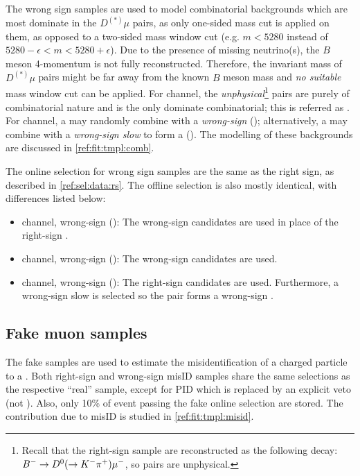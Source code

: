 The wrong sign samples are used to model combinatorial backgrounds which are
most dominate in the $D^{(*)}\mu$ pairs,
as only one-sided mass cut is applied on them, as opposed to a two-sided
mass window cut
(e.g. $m < 5280$ instead of $5280 - \epsilon < m < 5280 + \epsilon$).
Due to the presence of missing neutrino(s), the $B$ meson 4-momentum is not
fully reconstructed.
Therefore,
the invariant mass of $D^{(*)}\mu$ pairs might be far away from the known $B$
meson mass and \emph{no suitable} mass window cut can be applied.
For \Dz channel, the \emph{unphysical}\footnote{
    Recall that the right-sign sample are reconstructed as the following decay:
    ${{{B}^-}} \rightarrow {\ensuremath{{D}^0}} (\rightarrow {\ensuremath{{K}^-}} {\ensuremath{{\pi}^+}}) {\mu^-}$,
    so \Dz\mup pairs are unphysical.
} \Dz\mup pairs are purely of combinatorial
nature and is the only dominate combinatorial;
this is referred as \BComb.
For \Dstar channel, a \Dstarp may randomly combine with a
\emph{wrong-sign \mup} (\BComb); alternatively, a \Dz may combine with a
\emph{wrong-sign slow \pim} to form a \Dstarm (\DstComb).
The modelling of these backgrounds are discussed in
\cref{ref:fit:tmpl:comb}.

The online selection for wrong sign samples are the same as the right sign,
as described in \cref{ref:sel:data:rs}.
The offline selection is also mostly identical, with differences listed below:

\begin{itemize}
    \item \Dz channel, wrong-sign \muon (\BComb):
        The wrong-sign \Dz\mup candidates are used in place of the right-sign
        \Dz\mun.
    \item \Dstar channel, wrong-sign \muon (\BComb):
        The wrong-sign \Dz\mup candidates are used.
    \item \Dstar channel, wrong-sign \pion (\DstComb):
        The right-sign \Dz\mun candidates are used.
        Furthermore, a wrong-sign slow \pim is selected so the \Dz\pim pair
        forms a wrong-sign \Dstarm.
\end{itemize}


\subsection{Fake muon samples}

The fake \muon samples are used to estimate the misidentification of a charged
particle to a \muon.
Both right-sign and wrong-sign misID samples share the same selections
as the respective ``real'' \muon sample,
except for \muon PID which is replaced by an explicit \muon veto
(not \isMuon).
Also, only 10\% of event passing the fake \muon online selection are stored.
The contribution due to \muon misID is studied in \cref{ref:fit:tmpl:misid}.
